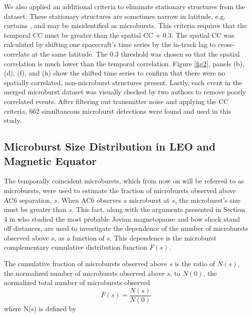 \documentclass[draft]{agujournal2019}
\begin{document}
We also applied an additional criteria to eliminate stationary structures from the dataset. These stationary structures are sometimes narrow in latitude, e.g. curtains \cite{Blake2016}, and may be misidentified as microbursts. This criteria requires that the temporal CC must be greater than the spatial CC + 0.3. The spatial CC was calculated by shifting one spacecraft's time series by the in-track lag to cross-correlate at the same latitude. The 0.3 threshold was chosen so that the spatial correlation is much lower than the temporal correlation. Figure \ref{fig2}, panels (b), (d), (f), and (h) show the shifted time series to confirm that there were no spatially correlated, non-microburst structures present. Lastly, each event in the merged microburst dataset was visually checked by two authors to remove poorly correlated events. After filtering out transmitter noise and applying the CC criteria, 662 simultaneous microburst detections were found and used in this study.	

\subsection{Microburst Size Distribution in LEO and Magnetic Equator}\label{microburst_distribution}
The temporally coincident microbursts, which from now on will be referred to as microbursts, were used to estimate the fraction of microbursts observed above AC6 separation, $s$. When AC6 observes a microburst at $s$, the microburst's size must be greater than $s$. This fact, along with the arguments presented in Section 4 in  who studied the most probable Jovian magnetopause and bow shock stand off distances, are used to investigate the dependence of the number of microbursts observed above $s$, as a function of $s$. This dependence is the microburst complementary cumulative distribution function $\bar{F}(s)$. 

The cumulative fraction of microbursts observed above $s$ is the ratio of $N(s)$, the normalized number of microbursts observed above $s$, to $N(0)$, the normalized total number of microbursts observed 
\begin{equation} \label{Fs}
\bar{F}(s) = \frac{N(s)}{N(0)}
\end{equation} where N(s) is defined by
\end{document}

